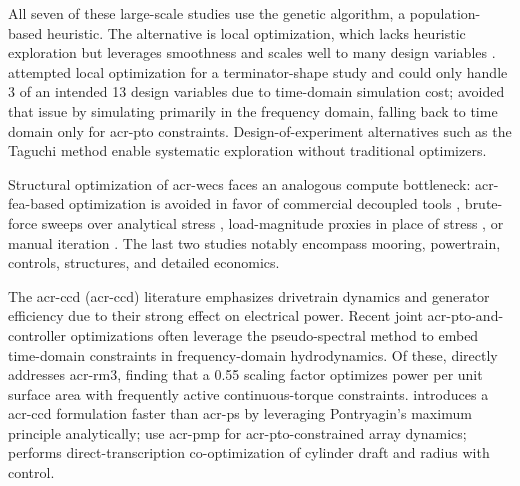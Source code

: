    All seven of these large-scale studies \citep{khanal_multi-objective_2024,gaudin_single_2021,edwards_optimisation_2022,garcia-teruel_reliability-based_2021,garcia-teruel_design_2022,cotten_multi-objective_2022,abdulkadir_control_2024} use the genetic algorithm, a population-based heuristic.
    The alternative is local optimization, which lacks heuristic exploration but leverages smoothness and scales well to many design variables \citep{martins_engineering_2022}.
    \citet{housner_numerical_2024} attempted local optimization for a terminator-shape study and could only handle 3 of an intended 13 design variables due to time-domain simulation cost;
    \citet{garcia-teruel_reliability-based_2021,garcia-teruel_design_2022,cotten_multi-objective_2022} avoided that issue by simulating primarily in the frequency domain, falling back to time domain only for \gls{acr-pto} constraints.
    Design-of-experiment alternatives such as the Taguchi method \citep{al_shami_parameter_2019} enable systematic exploration without traditional optimizers.

    Structural optimization of \glspl{acr-wec} faces an analogous compute bottleneck: \gls{acr-fea}-based optimization is avoided in favor of commercial decoupled tools \citep{an_optimal_2024}, brute-force sweeps over analytical stress \citep{ambuhl_reliability-based_2014}, load-magnitude proxies in place of stress \citep{nguyen_theoretical_2024,ferri_balancing_2014,garcia-teruel_reliability-based_2021,cotten_multi-objective_2022}, or manual iteration \citep{RM3,mi_multi-scale_2025}.
    The last two studies \citep{RM3,mi_multi-scale_2025} notably encompass mooring, powertrain, controls, structures, and detailed economics.

    The \gls{acr-ccd} (\gls{acr-ccd}) literature \citep{garcia-sanz_control_2019,coe_useful_2023} emphasizes drivetrain dynamics and generator efficiency due to their strong effect on electrical power.
    Recent joint \gls{acr-pto}-and-controller optimizations \citep{rosati_control_2023,son_performance_2016,anderson_re-imagining_2024,devin_high-dimensional_2024,grasberger_control_2024,gaebele_tpl_2025} often leverage the pseudo-spectral method to embed time-domain constraints in frequency-domain hydrodynamics.
    Of these, \citet{gaebele_tpl_2025} directly addresses \gls{acr-rm3}, finding that a 0.55 scaling factor optimizes power per unit surface area with frequently active continuous-torque constraints.
    \citet{lin_fast_2025} introduces a \gls{acr-ccd} formulation faster than \gls{acr-ps} by leveraging Pontryagin's maximum principle analytically; \citet{abdulkadir_optimal_2024} use \gls{acr-pmp} for \gls{acr-pto}-constrained array dynamics; \citet{herber_dynamic_2014} performs direct-transcription co-optimization of cylinder draft and radius with control.

